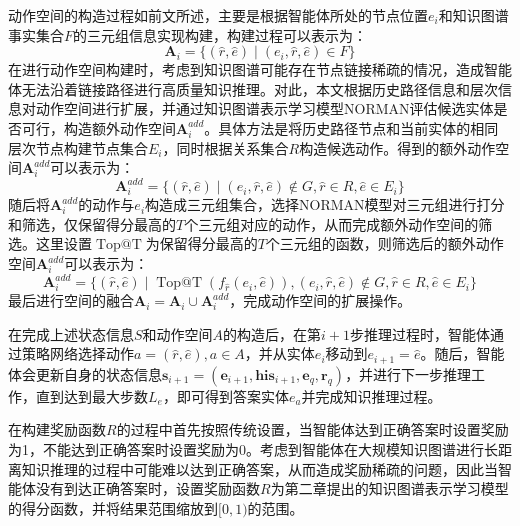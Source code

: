 \documentclass[algorithmlist, AutoFakeBold, AutoFakeSlant, figurelist, tablelist, nomlist, engineering]{seuthesix}
\begin{document}
动作空间的构造过程如前文所述，主要是根据智能体所处的节点位置$e_i$和知识图谱事实集合$F$的三元组信息实现构建，构建过程可以表示为：
\begin{equation}
  \bm{A}_i = \{(\hat{r}, \hat{e}) \mid (e_i, \hat{r}, \hat{e}) \in F\}
  \label{base_1}
\end{equation}
在进行动作空间构建时，考虑到知识图谱可能存在节点链接稀疏的情况，造成智能体无法沿着链接路径进行高质量知识推理。对此，本文根据历史路径信息和层次信息对动作空间进行扩展，并通过知识图谱表示学习模型NORMAN评估候选实体是否可行，构造额外动作空间$\bm{A}_{i}^{add}$。具体方法是将历史路径节点和当前实体的相同层次节点构建节点集合$E_i$，同时根据关系集合$R$构造候选动作。得到的额外动作空间$\bm{A}_{i}^{add}$可以表示为：
\begin{equation}
  \bm{A}_{i}^{add} = \{(\hat{r}, \hat{e}) \mid (e_i, \hat{r}, \hat{e}) \notin G, \hat{r} \in R, \hat{e} \in E_i \}
  \label{extra_1}
\end{equation}
随后将$\bm{A}_{i}^{add}$的动作与$e_i$构造成三元组集合，选择NORMAN模型对三元组进行打分和筛选，仅保留得分最高的$T$个三元组对应的动作，从而完成额外动作空间的筛选。这里设置$\operatorname{Top@T}$为保留得分最高的$T$个三元组的函数，则筛选后的额外动作空间$\bm{A}_{i}^{add}$可以表示为：
\begin{equation}
  \bm{A}_i^{add} = \{(\hat{r}, \hat{e}) \mid \operatorname{Top@T}(f_{\hat{r}}(e_i, \hat{e})), (e_i, \hat{r}, \hat{e}) \notin G, \hat{r} \in R, \hat{e} \in E_i \}
\end{equation}
最后进行空间的融合$\bm{A}_i = \bm{A}_i \cup \bm{A}_{i}^{add} $，完成动作空间的扩展操作。

在完成上述状态信息$S$和动作空间$A$的构造后，在第$i+1$步推理过程时，智能体通过策略网络选择动作$a = (\hat{r}, \hat{e}), a \in A$，并从实体$e_i$移动到$e_{i+1} = \hat{e}$。随后，智能体会更新自身的状态信息$\bm{s}_{i+1} = (\bm{e}_{i+1}, \bm{his}_{i+1}, \bm{e}_q, \bm{r}_q)$，并进行下一步推理工作，直到达到最大步数$L_e$，即可得到答案实体$e_a$并完成知识推理过程。

在构建奖励函数$R$的过程中首先按照传统设置，当智能体达到正确答案时设置奖励为1，不能达到正确答案时设置奖励为0。考虑到智能体在大规模知识图谱进行长距离知识推理的过程中可能难以达到正确答案，从而造成奖励稀疏的问题，因此当智能体没有到达正确答案时，设置奖励函数$R$为第二章提出的知识图谱表示学习模型的得分函数，并将结果范围缩放到$[0, 1)$的范围。
\end{document}
